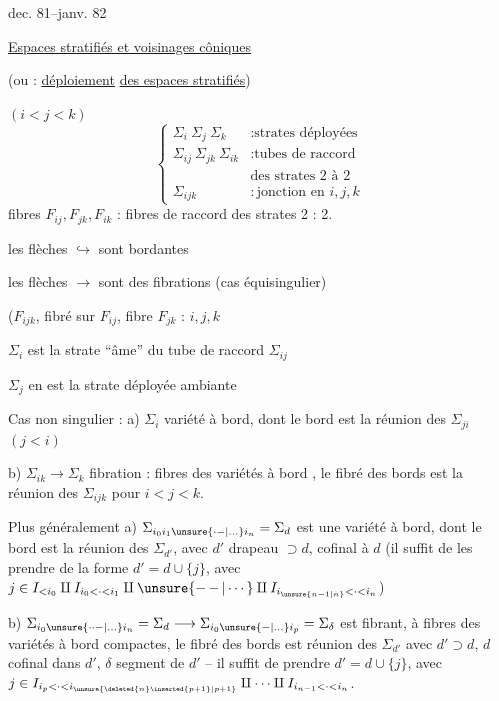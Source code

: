 dec. 81--janv. 82

\uline{Espaces stratifiés et voisinages côniques}

(ou : \uline{déploiement} \uline{des espaces stratifiés})


$(i<j<k)$
\[
\left\{\begin{array}{ll}
\Sigma_i\ \Sigma_j\ \Sigma_k &: \text{strates déployées}\\
\Sigma_{ij}\ \Sigma_{jk}\ \Sigma_{ik} &: \text{tubes de raccord}\\
&\text{des strates 2 à 2}\\
\Sigma_{ijk} &: \text{jonction en }i,j,k
\end{array}\right.
\]
fibres $F_{ij},F_{jk},F_{ik}$ : fibres de raccord
 des strates 2 : 2.

les flèches $\hookrightarrow$ sont bordantes

les flèches $\longrightarrow$ sont des fibrations 
(cas équisingulier)

($F_{ijk}$, fibré sur $F_{ij}$, fibre $F_{jk}$ : 
 $i,j,k$

$\Sigma_i$ est la strate  ``âme'' du tube de raccord $\Sigma_{ij}$

$\Sigma_j$ en est la strate déployée ambiante

Cas non singulier : a) $\Sigma_i$ variété à bord, dont le bord est
la réunion des $\Sigma_{ji}$ $(j<i)$

b) $\Sigma_{ik}\longrightarrow\Sigma_k$ fibration : fibres des
variétés à bord , le fibré des bords est
la réunion des $\Sigma_{ijk}$ pour $i<j<k$.

Plus généralement \unsure{;|:} a) $\Sigma_{i_0i_1\unsure{\mathinner{\cdot-}|\ldots}i_n}=\Sigma_d$ est une
variété à bord, dont le bord est la réunion des
$\Sigma_{d'}$, avec $d'$ drapeau $\supset d$, cofinal à $d$
(il suffit de les prendre de la forme $d'=d\cup\{j\}$,
avec $j\in I_{<i_0}\amalg I_{i_0<\cdot<i_1}\amalg\unsure{\mathinner{-\,-}|\cdots}\amalg I_{i_{\unsure{n-1|n}}<\cdot<i_n}$)

b) $\Sigma_{i_0\unsure{\mathinner{\cdot\cdot-}|\ldots}i_n}=\Sigma_d\longrightarrow\Sigma_{i_0\unsure{-|\ldots}i_p}=\Sigma_\delta$
est fibrant, à fibres des variétés à bord compactes,
le fibré des bords est réunion des $\Sigma_{d'}$
avec $d'\supset d$, $d$ cofinal dans $d'$, $\delta$ segment 
de $d'$ -- il suffit de prendre $d'=d\cup\{j\}$, avec
$j\in I_{i_p<\cdot<i_{\unsure{\deleted{n}\inserted{p+1}|p+1}}}\amalg\cdots\amalg I_{i_{n-1}<\cdot<i_n}$.

